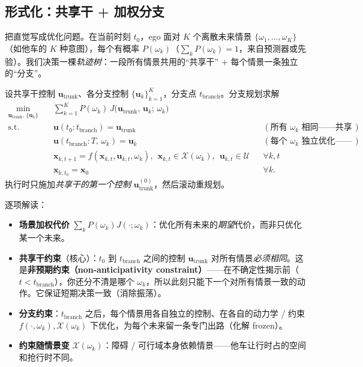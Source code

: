 \subsection{形式化：共享干 + 加权分支}
\label{sec:pr-branch-formal}

把直觉写成优化问题。在当前时刻 $t_0$，ego 面对 $K$ 个离散未来情景 $\{\omega_1,\dots,\omega_K\}$（如他车的 $K$ 种意图），每个有概率 $P(\omega_k)$（$\sum_k P(\omega_k)=1$，来自预测器或先验）。我们决策一棵\emph{轨迹树}：一段所有情景共用的“共享干” + 每个情景一条独立的“分支”\cite{hardy2013contingency}。

\begin{definition}[分支 / contingency 规划]\label{def:pr-contingency}
设共享干控制 $\mathbf{u}_{\mathrm{trunk}}$、各分支控制 $\{\mathbf{u}_k\}_{k=1}^K$，分支点 $t_{\mathrm{branch}}$。分支规划求解
\begin{equation}
\begin{aligned}
\min_{\mathbf{u}_{\mathrm{trunk}},\,\{\mathbf{u}_k\}}\quad & \sum_{k=1}^{K} P(\omega_k)\, J\big(\mathbf{u}_{\mathrm{trunk}},\,\mathbf{u}_k;\,\omega_k\big)\\
\text{s.t.}\quad
& \mathbf{u}(t_0:t_{\mathrm{branch}}) = \mathbf{u}_{\mathrm{trunk}} && (\text{所有 }\omega_k\text{ 相同——共享干 / 非预期约束})\\
& \mathbf{u}(t_{\mathrm{branch}}:T,\,\omega_k) = \mathbf{u}_k && (\text{每个 }\omega_k\text{ 独立优化——分支})\\
& \mathbf{x}_{k,t+1}=f(\mathbf{x}_{k,t},\mathbf{u}_{k,t},\omega_k),\ \ \mathbf{x}_{k,t}\in\mathcal{X}(\omega_k),\ \ \mathbf{u}_{k,t}\in\mathcal{U} && \forall k,t\\
& \mathbf{x}_{k,t_0}=\mathbf{x}_0 && \forall k.
\end{aligned}
\label{eq:pr-contingency}
\end{equation}
执行时只施加\emph{共享干的第一个控制} $\mathbf{u}_{\mathrm{trunk}}^{(0)}$，然后滚动重规划。
\end{definition}

逐项解读：
\begin{itemize}
  \item \textbf{场景加权代价} $\sum_k P(\omega_k) J(\cdot;\omega_k)$：优化所有未来的\emph{期望}代价，而非只优化某一个未来。
  \item \textbf{共享干约束}（核心）：$t_0$ 到 $t_{\mathrm{branch}}$ 之间的控制 $\mathbf{u}_{\mathrm{trunk}}$ 对所有情景\emph{必须相同}。这是\textbf{非预期约束（non-anticipativity constraint）}——在不确定性揭示前（$t<t_{\mathrm{branch}}$），你还分不清是哪个 $\omega_k$，所以此刻只能下一个对所有情景一致的动作。它保证短期决策一致（消除振荡）。
  \item \textbf{分支约束}：$t_{\mathrm{branch}}$ 之后，每个情景用各自独立的控制、在各自的动力学 / 约束 $f(\cdot,\omega_k),\mathcal{X}(\omega_k)$ 下优化，为每个未来留一条专门出路（化解 frozen）。
  \item \textbf{约束随情景变} $\mathcal{X}(\omega_k)$：障碍 / 可行域本身依赖情景——他车让行时占的空间和抢行时不同。
\end{itemize}

